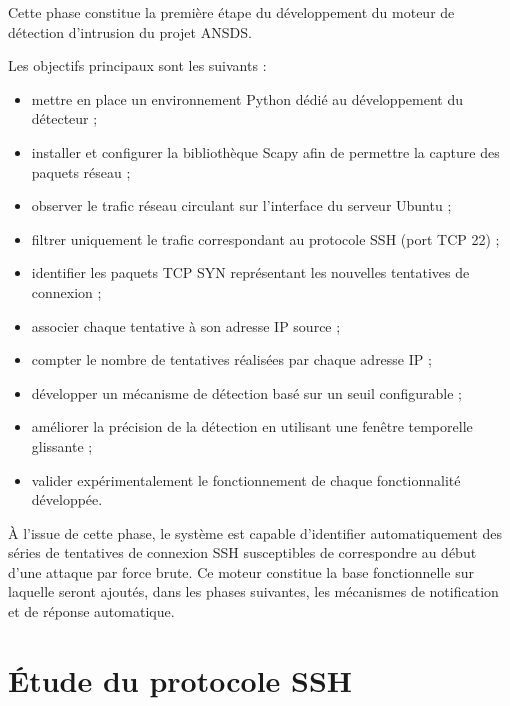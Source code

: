 Cette phase constitue la première étape du développement du moteur de détection d'intrusion du projet ANSDS.

Les objectifs principaux sont les suivants :

\begin{itemize}

\item mettre en place un environnement Python dédié au développement du détecteur ;

\item installer et configurer la bibliothèque Scapy afin de permettre la capture des paquets réseau \cite{scapy_docs} ;

\item observer le trafic réseau circulant sur l'interface du serveur Ubuntu ;

\item filtrer uniquement le trafic correspondant au protocole SSH (port TCP 22) \cite{rfc4253} ;

\item identifier les paquets TCP SYN représentant les nouvelles tentatives de connexion \cite{rfc793} ;

\item associer chaque tentative à son adresse IP source ;

\item compter le nombre de tentatives réalisées par chaque adresse IP ;

\item développer un mécanisme de détection basé sur un seuil configurable ;

\item améliorer la précision de la détection en utilisant une fenêtre temporelle glissante ;

\item valider expérimentalement le fonctionnement de chaque fonctionnalité développée.

\end{itemize}

À l'issue de cette phase, le système est capable d'identifier automatiquement des séries de tentatives de connexion SSH susceptibles de correspondre au début d'une attaque par force brute. Ce moteur constitue la base fonctionnelle sur laquelle seront ajoutés, dans les phases suivantes, les mécanismes de notification et de réponse automatique.

\section{Étude du protocole SSH}

